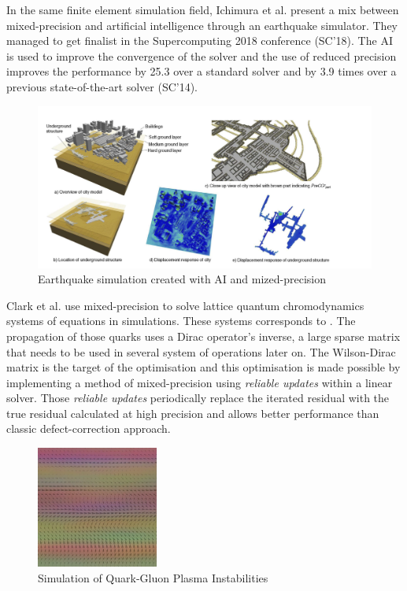 In the same finite element simulation field, Ichimura et al. \cite{Ichimura2018} present a mix between mixed-precision and artificial intelligence through an earthquake simulator. They managed to get finalist in the Supercomputing 2018 conference (SC'18). The AI is used to improve the convergence of the solver and the use of reduced precision improves the performance by 25.3 over a standard solver and by 3.9 times over a previous state-of-the-art solver (SC'14).

\begin{figure}[htbp]
	\centering
		\includegraphics[width=16cm]{Figures/EarthquakeSim.png}
	\caption[Earthquake Simulation]{Earthquake simulation created with AI and mized-precision \cite{Ichimura2018}}
	\label{fig:EarthquakeSim}
\end{figure}

Clark et al. \cite{Clark2010} use mixed-precision to solve lattice quantum chromodynamics systems of equations in simulations. These systems corresponds to . The propagation of those quarks uses a Dirac operator's inverse, a large sparse matrix that needs to be used in several system of operations later on. The Wilson-Dirac matrix is the target of the optimisation and this optimisation is made possible by implementing a method of mixed-precision using \emph{reliable updates} within a linear solver. Those \emph{reliable updates} periodically replace the iterated residual with the true residual calculated at high precision and allows better performance than classic defect-correction approach.

\begin{figure}[htbp]
	\centering
		\includegraphics[width=4cm]{Figures/QuarkSim.png}
	\caption[Quark Simulation]{Simulation of Quark-Gluon Plasma Instabilities \cite{Ipp2011}}
	\label{fig:QuarkSim}
\end{figure}

